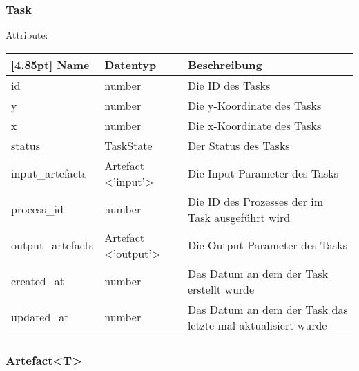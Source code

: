             \subsubsection{Task}
            
            Attribute:
            \begin{center}
            	\renewcommand{\arraystretch}{1.5}
                \setlength\tabcolsep{5pt}
            	\begin{tabularx}{\textwidth}{|l|l|X|}
            		\hline
                    \rowcolor[gray]{0.75}[4.85pt]            		
                    Name & Datentyp & Beschreibung \\ \hline
                    id & number & Die ID des Tasks \\ \hline
                    y & number & Die y-Koordinate des Tasks\\ \hline
                    x & number & Die x-Koordinate des Tasks \\ \hline
                    status & TaskState & Der Status des Tasks \\ \hline
                    input_artefacts & Artefact <'input'> & Die Input-Parameter des Tasks \\ \hline
                    process_id & number & Die ID des Prozesses der im Task ausgeführt wird \\ \hline
                    output_artefacts & Artefact <'output'> & Die Output-Parameter des Tasks \\ \hline
                    created_at & number & Das Datum an dem der Task erstellt wurde \\ \hline
                    updated_at & number & Das Datum an dem der Task das letzte mal aktualisiert wurde \\ \hline
            	\end{tabularx}
            \end{center}
                
    		\subsubsection{Artefact<T>}
    		
